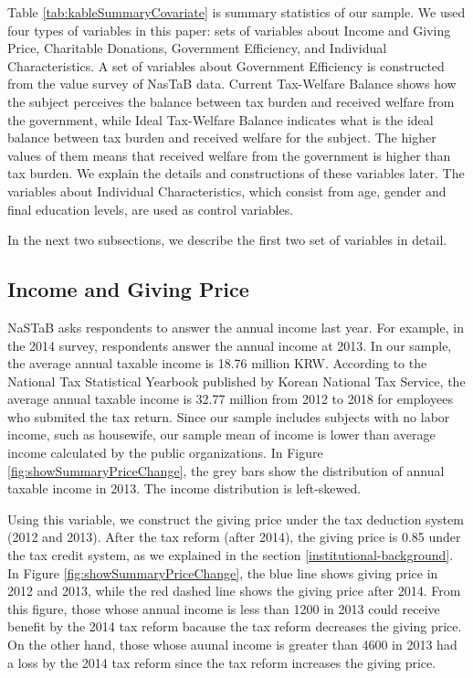 \documentclass[ review  , 3p ]{elsarticle}
\begin{document}
  Table \ref{tab:kableSummaryCovariate} is summary statistics of our sample.
  We used four types of variables in this paper:
  sets of variables about Income and Giving Price,
  Charitable Donations,
  Government Efficiency,
  and Individual Characteristics.
  A set of variables about Government Efficiency is constructed from the value survey of NasTaB data.
  Current Tax-Welfare Balance shows how the subject perceives the balance between tax burden and received welfare from the government,
  while Ideal Tax-Welfare Balance indicates what is the ideal balance between tax burden and received welfare for the subject.
  The higher values of them means that received welfare from the government is higher than tax burden.
  We explain the details and constructions of these variables later.
  The variables about Individual Characteristics,
  which consist from age, gender and final education levels, are used as control variables.

  In the next two subsections,
  we describe the first two set of variables in detail.

  \hypertarget{income-and-giving-price}{%
  \subsection{Income and Giving Price}\label{income-and-giving-price}}

  NaSTaB asks respondents to answer the annual income last year.
  For example, in the 2014 survey, respondents answer the annual income at 2013.
  In our sample, the average annual taxable income is 18.76 million KRW.
  According to the National Tax Statistical Yearbook published by Korean National Tax Service,
  the average annual taxable income is 32.77 million from 2012 to 2018
  for employees who submited the tax return.
  Since our sample includes subjects with no labor income, such as housewife,
  our sample mean of income is lower than average income calculated by the public organizations.
  In Figure \ref{fig:showSummaryPriceChange},
  the grey bars show the distribution of annual taxable income in 2013.
  The income distribution is left-skewed.

  Using this variable, we construct the giving price under the tax deduction system (2012 and 2013).
  After the tax reform (after 2014), the giving price is 0.85 under the tax credit system,
  as we explained in the section \ref{institutional-background}.
  In Figure \ref{fig:showSummaryPriceChange},
  the blue line shows giving price in 2012 and 2013,
  while the red dashed line shows the giving price after 2014.
  From this figure,
  those whose annual income is less than 1200 in 2013 could receive benefit by the 2014 tax reform
  bacause the tax reform decreases the giving price.
  On the other hand,
  those whose auunal income is greater than 4600 in 2013 had a loss by the 2014 tax reform
  since the tax reform increases the giving price.
\end{document}
